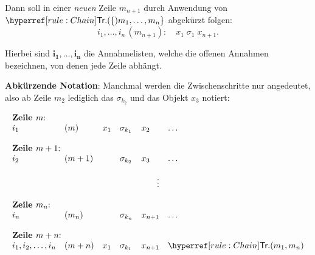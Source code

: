 \documentclass[main.tex]{subfiles}
\begin{document}
Dann soll in einer \emph{neuen} Zeile \(m_{n+1}\) durch Anwendung von \(\rChain\{m_1,\dots,m_n\}\) abgekürzt folgen:
\[
i_1,\dots,i_n \,(m_{n+1})\colon
\quad
x_1 \;\sigma_1\; x_{n+1}.
\]

Hierbei sind \(\boldsymbol{i_1, \dots, i_n}\) die Annahmelisten, welche die offenen Annahmen bezeichnen, von denen jede Zeile abhängt. 


\noindent
\textbf{Abkürzende Notation}:  
Manchmal werden die Zwischenschritte nur angedeutet, also ab Zeile \(m_2\) lediglich das \(\sigma_{k_2}\) und das Objekt \(x_3\) notiert:

    \[
	\begin{array}{llclll}
            \multicolumn{6}{l}{\textbf{Zeile } m \text{:}}\\
             i_1 &  (m)  & x_1&\sigma_{k_1}& x_2 & \dots \\
            \multicolumn{6}{l}{}\\
            \multicolumn{6}{l}{\textbf{Zeile } m+1 \text{:}}\\
             i_2 &  (m+1)  &  &\sigma_{k_2}& x_3 & \dots \\
            \multicolumn{6}{c}{}\\
            \multicolumn{6}{c}{\vdots}\\
            \multicolumn{6}{l}{}\\
            \multicolumn{6}{l}{\textbf{Zeile } m_n \text{:}}\\
             i_n &  (m_n)  & &\sigma_{k_n}&x_{n+1} & \dots \\   
            \multicolumn{6}{l}{}\\
            \multicolumn{6}{l}{\textbf{Zeile } m+n \text{:}}\\
             i_1,i_2,\dots,i_n &  (m+n)  & x_1&\sigma_{k_1}& x_{n+1} & \rChain{m_1,m_n} 
        \end{array}
    \]
    
\end{document}
